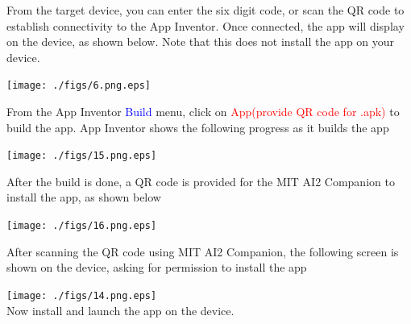 \documentclass[journal,12pt,twocolumn]{IEEEtran}
\begin{document}
%
\begin{problem}
From the target device, you can enter the six digit code, or scan the QR
code to establish connectivity to the App Inventor. Once connected, the app will display on the device, as shown below.  Note that this does not install the app on your device.
\end{problem}
\texttt{[image: ./figs/6.png.eps]}
%
\begin{problem}
From the App Inventor \textcolor{blue}{Build} menu, click on \textcolor{red}{App(provide QR code for .apk)} to build the app. App Inventor shows the following progress as it builds the app
\end{problem}
\texttt{[image: ./figs/15.png.eps]}
\begin{problem}
After the build is done, a QR code is provided for the MIT AI2 Companion to install the app, as shown below 
\end{problem}
%
\texttt{[image: ./figs/16.png.eps]}
%
\begin{problem}
After scanning the QR code using MIT AI2 Companion, the following screen is shown on the device, asking for permission to install the app
\end{problem}
\texttt{[image: ./figs/14.png.eps]}\\
%
Now install and launch the app on the device.
%
\end{document}
